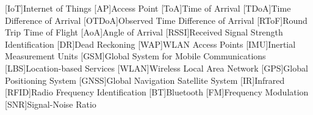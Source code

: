 \begin{acronym}[OTDoA]
	[IoT]{Internet of Things}
	[AP]{Access Point}
	[ToA]{Time of Arrival}
	[TDoA]{Time Difference of Arrival}
	[OTDoA]{Observed Time Difference of Arrival}
	[RToF]{Round Trip Time of Flight}
	[AoA]{Angle of Arrival}
	[RSSI]{Received Signal Strength Identification}
	[DR]{Dead Reckoning}
	[WAP]{WLAN Access Points}
	[IMU]{Inertial Measurement Units}
	[GSM]{Global System for Mobile Communications}
	[LBS]{Location-based Services}
	[WLAN]{Wireless Local Area Network}
	[GPS]{{Global Positioning System}}
	[GNSS]{Global Navigation Satellite System}
	[IR]{Infrared}
	[RFID]{Radio	Frequency Identification}
	[BT]{Bluetooth}
	[FM]{Frequency Modulation}
	[SNR]{Signal-Noise Ratio}
\end{acronym}